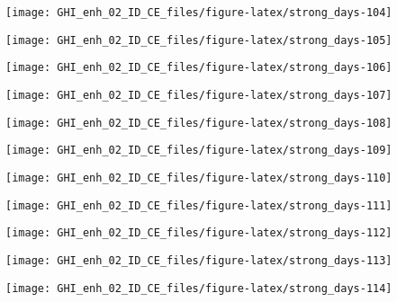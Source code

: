 \documentclass[
  10pt,
  a4paper,oneside]{article}
\begin{document}
\begin{center}\texttt{[image: GHI\_enh\_02\_ID\_CE\_files/figure-latex/strong\_days-104]} \end{center}

\begin{center}\texttt{[image: GHI\_enh\_02\_ID\_CE\_files/figure-latex/strong\_days-105]} \end{center}

\begin{center}\texttt{[image: GHI\_enh\_02\_ID\_CE\_files/figure-latex/strong\_days-106]} \end{center}

\begin{center}\texttt{[image: GHI\_enh\_02\_ID\_CE\_files/figure-latex/strong\_days-107]} \end{center}

\begin{center}\texttt{[image: GHI\_enh\_02\_ID\_CE\_files/figure-latex/strong\_days-108]} \end{center}

\begin{center}\texttt{[image: GHI\_enh\_02\_ID\_CE\_files/figure-latex/strong\_days-109]} \end{center}

\begin{center}\texttt{[image: GHI\_enh\_02\_ID\_CE\_files/figure-latex/strong\_days-110]} \end{center}

\begin{center}\texttt{[image: GHI\_enh\_02\_ID\_CE\_files/figure-latex/strong\_days-111]} \end{center}

\begin{center}\texttt{[image: GHI\_enh\_02\_ID\_CE\_files/figure-latex/strong\_days-112]} \end{center}

\begin{center}\texttt{[image: GHI\_enh\_02\_ID\_CE\_files/figure-latex/strong\_days-113]} \end{center}

\begin{center}\texttt{[image: GHI\_enh\_02\_ID\_CE\_files/figure-latex/strong\_days-114]} \end{center}
\end{document}
